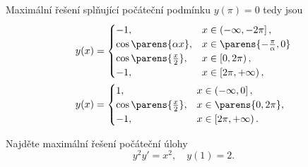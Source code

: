 \documentclass[answers]{exam}
\begin{document}
\begin{questions}
\begin{solution}
\begin{enumerate}[label=(\roman*)]
	  	Maximální řešení splňující počáteční podmínku $y(\pi) = 0$ tedy jsou
	  	\begin{align*}
	  		y(x) &=
	  		\begin{cases}
	  			-1, \quad &x \in \left( -\infty, -2\pi \right],
	  			\\
	  			\cos \parens{\alpha x}, &x \in \parens{-\frac{\pi}{\alpha}, 0}
	  			\\
	  			\cos \parens{\frac{x}{2}}, &x \in \left[ 0, 2\pi \right),
	  			\\
	  			-1, \quad &x \in \left[2\pi, +\infty \right),
	  		\end{cases}
	  		\\
	  		y(x) &=
	  		\begin{cases}
	  			1, \quad &x \in \left( -\infty, 0 \right],
	  			\\
	  			\cos \parens{\frac{x}{2}}, &x \in \parens{0, 2\pi},
	  			\\
	  			- 1, \quad &x \in \left[2\pi, +\infty \right).
	  		\end{cases}	 	  		
	  	\end{align*}

	\end{enumerate}  
	
  \end{solution}
  
  \question
  Najd\v ete  maxim\'aln\'i \v re\v sen\'i počáteční úlohy
  \begin{equation*}
  y^2y'=x^2,
  \quad 
  y(1)=2. 
  \end{equation*}
  

\end{questions}
\end{document}
